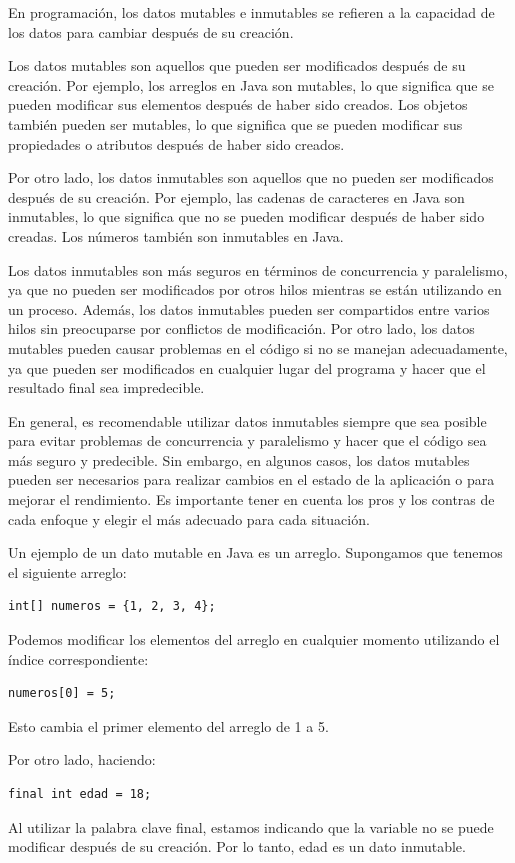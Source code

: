 \documentclass[executivepaper]{article}
\begin{document}
En programación, los datos mutables e inmutables se refieren a la capacidad de los datos para cambiar después de su creación.

Los datos mutables son aquellos que pueden ser modificados después de su creación. Por ejemplo, los arreglos en Java son mutables, lo que significa que se pueden modificar sus elementos después de haber sido creados. Los objetos también pueden ser mutables, lo que significa que se pueden modificar sus propiedades o atributos después de haber sido creados.

Por otro lado, los datos inmutables son aquellos que no pueden ser modificados después de su creación. Por ejemplo, las cadenas de caracteres en Java son inmutables, lo que significa que no se pueden modificar después de haber sido creadas. Los números también son inmutables en Java.

Los datos inmutables son más seguros en términos de concurrencia y paralelismo, ya que no pueden ser modificados por otros hilos mientras se están utilizando en un proceso. Además, los datos inmutables pueden ser compartidos entre varios hilos sin preocuparse por conflictos de modificación. Por otro lado, los datos mutables pueden causar problemas en el código si no se manejan adecuadamente, ya que pueden ser modificados en cualquier lugar del programa y hacer que el resultado final sea impredecible.

En general, es recomendable utilizar datos inmutables siempre que sea posible para evitar problemas de concurrencia y paralelismo y hacer que el código sea más seguro y predecible. Sin embargo, en algunos casos, los datos mutables pueden ser necesarios para realizar cambios en el estado de la aplicación o para mejorar el rendimiento. Es importante tener en cuenta los pros y los contras de cada enfoque y elegir el más adecuado para cada situación.

Un ejemplo de un dato mutable en Java es un arreglo. Supongamos que tenemos el siguiente arreglo:
\begin{lstlisting}
int[] numeros = {1, 2, 3, 4};
\end{lstlisting}
Podemos modificar los elementos del arreglo en cualquier momento utilizando el índice correspondiente:
\begin{lstlisting}
numeros[0] = 5;
\end{lstlisting}
Esto cambia el primer elemento del arreglo de 1 a 5.

Por otro lado, haciendo:
\begin{lstlisting}
final int edad = 18;
\end{lstlisting}
Al utilizar la palabra clave final, estamos indicando que la variable no se puede modificar después de su creación. Por lo tanto, edad es un dato inmutable.
\end{document}
